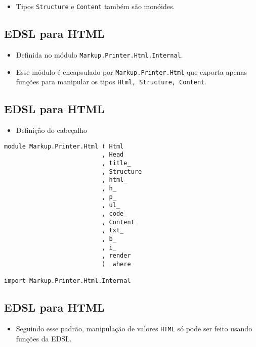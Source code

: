 \documentclass[11pt]{article}
\begin{document}
\begin{itemize}
\item Tipos \texttt{Structure} e \texttt{Content} também são monóides.
\end{itemize}
\subsection*{EDSL para HTML}
\label{sec:orgc95e429}

\begin{itemize}
\item Definida no módulo \texttt{Markup.Printer.Html.Internal}.

\item Esse módulo é encapsulado por \texttt{Markup.Printer.Html} que
exporta apenas funções para manipular os tipos \texttt{Html, Structure, Content}.
\end{itemize}
\subsection*{EDSL para HTML}
\label{sec:org0757a19}

\begin{itemize}
\item Definição do cabeçalho
\end{itemize}

\begin{verbatim}
module Markup.Printer.Html ( Html
                           , Head
                           , title_
                           , Structure
                           , html_
                           , h_
                           , p_
                           , ul_
                           , code_
                           , Content
                           , txt_
                           , b_
                           , i_
                           , render
                           )  where

import Markup.Printer.Html.Internal
\end{verbatim}
\subsection*{EDSL para HTML}
\label{sec:org7d77a49}

\begin{itemize}
\item Seguindo esse padrão, manipulação de valores \texttt{HTML} só
pode ser feito usando funções da EDSL.
\end{itemize}
\end{document}
